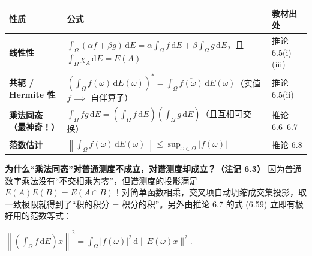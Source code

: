 \documentclass[11pt,a4paper]{article}
\newcounter{none}
\renewenvironment{quote}{%
  \begin{tcolorbox}[
    enhanced,
    breakable,
    colback=AccentSoft!48!white,
    colframe=AccentMain,
    boxrule=0pt,
    leftrule=2.8pt,
    arc=2.5pt,
    left=9pt, right=8pt, top=6pt, bottom=6pt,
    before skip=5.5pt, after skip=5.5pt
  ]\small
}{%
  \end{tcolorbox}%
}
\newcommand{\FitDisplayMath}[1]{%
  \par\vspace{4pt}\noindent
  \begin{adjustbox}{max width=\linewidth, center}
    $\displaystyle #1$
  \end{adjustbox}
  \par\vspace{4pt}%
}
\begin{document}
{\def\LTcaptype{none} %
{\small\renewcommand{\arraystretch}{1.38}\setlength{\tabcolsep}{5pt}
\begin{longtable}[]{@{}
  >{\raggedright\arraybackslash}p{}
  >{\raggedright\arraybackslash}p{}
  >{\centering\arraybackslash}p{}@{}}
\toprule\noalign{}
\rowcolor{AccentSoft}
\begin{minipage}[b]{\linewidth}\raggedright
性质
\end{minipage} & \begin{minipage}[b]{\linewidth}\raggedright
公式
\end{minipage} & \begin{minipage}[b]{\linewidth}\centering
教材出处
\end{minipage} \\
\midrule\noalign{}
\endhead
\bottomrule\noalign{}
\endlastfoot
\textbf{线性性} & \(\displaystyle \int_\Omega (\alpha f + \beta g)\,\mathrm{d}E = \alpha \int_\Omega f\,\mathrm{d}E + \beta \int_\Omega g\,\mathrm{d}E\)，且 \(\displaystyle \int_\Omega \chi_A \,\mathrm{d}E = E(A)\) & 推论 6.5(i)(iii) \\
\textbf{共轭 / Hermite 性} & \(\displaystyle \left(\int_\Omega f(\omega)\,\mathrm{d}E(\omega)\right)^* = \int_\Omega \overline{f(\omega)}\,\mathrm{d}E(\omega)\)（实值 \(f \implies\) 自伴算子） & 推论 6.5(ii) \\
\textbf{乘法同态（最神奇！）} & \(\displaystyle \int_\Omega f g\,\mathrm{d}E = \left(\int_\Omega f\,\mathrm{d}E\right)\left(\int_\Omega g\,\mathrm{d}E\right)\)（且互相可交换） & 推论 6.6--6.7 \\
\textbf{范数估计} & \(\displaystyle \left\lVert\int_\Omega f(\omega)\,\mathrm{d}E(\omega)\right\rVert \le \sup_{\omega \in \Omega} \lvert f(\omega) \rvert\) & 推论 6.8 \\
\end{longtable}
}
}

\begin{quote}
\textbf{为什么``乘法同态''对普通测度不成立，对谱测度却成立？（注记 6.3）} 因为普通数字乘法没有``不交相乘为零''，但谱测度的投影满足 \(E(A)E(B) = E(A \cap B)\)！对简单函数相乘，交叉项自动坍缩成交集投影，取一致极限就得到了``积的积分 = 积分的积''。另外由推论 6.7 的式 (6.59) 立即有极好用的范数等式： 
\FitDisplayMath{\left\|\left(\int_\Omega f\,\mathrm{d}E\right)x\right\|^2 = \int_\Omega |f(\omega)|^2 \,\mathrm{d}\|E(\omega)x\|^2.}

\end{quote}
\end{document}
